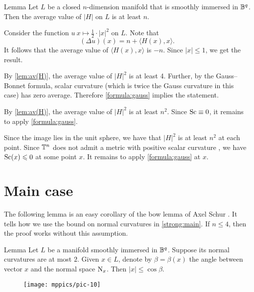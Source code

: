 \documentclass[a4paper,10pt]{article}
\begin{document}
\begin{thm}{Lemma}\label{lem:av(H)}
Let $L$ be a closed $n$-dimension manifold that is smoothly immersed in $\mathbb{B}^q$.
Then the average value of $|H|$ on $L$ is at least $n$.
\end{thm}

Consider the function $u\:x\mapsto \tfrac12\cdot |x|^2$ on $L$.
Note that 
\[(\Delta u)(x)=n+ \langle H(x),x\rangle.\]
It follows that the average value of $\langle H(x),x\rangle$ is $-n$.
Since $|x|\le1$, we get the result.
\qeds

By \ref{lem:av(H)}, the average value of $|H|^2$ is at least 4.
Further, by the Gauss--Bonnet formula, scalar curvature (which is twice the Gauss curvature in this case) has zero average.
Therefore \ref{formula:gauss} implies the statement.
\qeds

By \ref{lem:av(H)},
the average value of $|H|^2$ is at least $n^2$.
Since $\mathrm{Sc}\equiv0$, it remains to apply \ref{formula:gauss}.
\qeds

Since the image lies in the unit sphere, we have that $|H|^2$ is at least $n^2$ at each point.
Since $\mathbb{T}^n$ does not admit a metric with positive scalar curvature \cite[Corollary A]{gromov-lawson}, we have $\mathrm{Sc}(x)\leqslant 0$ at some point $x$.
It remains to apply \ref{formula:gauss} at $x$.
\qeds

\section{Main case}

The following lemma is an easy corollary of the bow lemma of Axel Schur \cite{shur,petrunin-zamora}.
It tells how we use the bound on normal curvatures in \ref{strong:main}.
If $n\le4$, then the proof works without this assumption.

\begin{thm}{Lemma}\label{lem:trivial}
Let $L$ be a manifold smoothly immersed in $\mathbb{B}^q$.
Suppose its normal curvatures are at most $2$.
Given $x\in L$, denote by $\beta=\beta(x)$ the angle between vector $x$ and the normal space $\mathrm{N}_x$.
Then $|x|\le \cos\beta$.
\end{thm}

\begin{wrapfigure}{r}{39 mm}
\vskip-3mm
\centering
\texttt{[image: mppics/pic-10]}
\vskip0mm
\end{wrapfigure}
\end{document}
